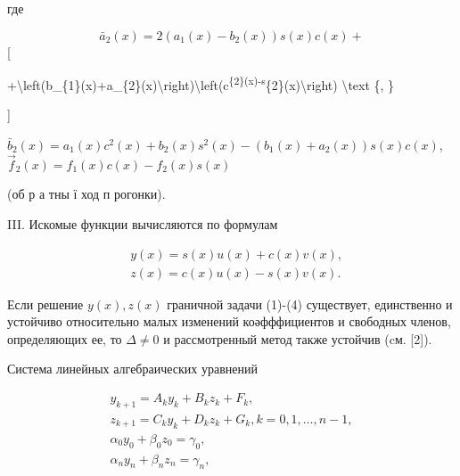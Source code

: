 \documentclass[10pt]{article}
\begin{document}
где



\[

\bar{a}_{2}(x)=2\left(a_{1}(x)-b_{2}(x)\right) s(x) c(x)+

\][



+\textbackslash left(b\_\{1\}(x)+a\_\{2\}(x)\textbackslash right)\textbackslash left(c\textsuperscript{\{2\}(x)-s}\{2\}(x)\textbackslash right) \textbackslash text \{, \}

]



$\bar{b}_{2}(x)=a_{1}(x) c^{2}(x)+b_{2}(x) s^{2}(x)-\left(b_{1}(x)+a_{2}(x)\right) s(x) c(x)$, $\vec{f}_{2}(x)=f_{1}(x) c(x)-f_{2}(x) s(x)$



(об р а тны ї ход п рогонки).



III. Искомые функции вычисляются по формулам



\[

\begin{aligned}

& y(x)=s(x) u(x)+c(x) v(x), \\

& z(x)=c(x) u(x)-s(x) v(x) .

\end{aligned}

\]



Если решение $y(x), z(x)$ граничной задачи (1)-(4) существует, единственно и устойчиво относительно малых изменений коәфффициентов и свободных членов, определяющих ее, то $\Delta \neq 0$ и рассмотренный метод также устойчив (cм. [2]).



Система линейных алгебраических уравнений



\[

\begin{gathered}

y_{k+1}=A_{k} y_{k}+B_{k} z_{k}+F_{k}, \\

z_{k+1}=C_{k} y_{k}+D_{k} z_{k}+G_{k}, k=0,1, \ldots, n-1, \\

\alpha_{0} y_{0}+\beta_{0} z_{0}=\gamma_{0}, \\

\alpha_{n} y_{n}+\beta_{n} z_{n}=\gamma_{n},

\end{gathered}

\]
\end{document}
